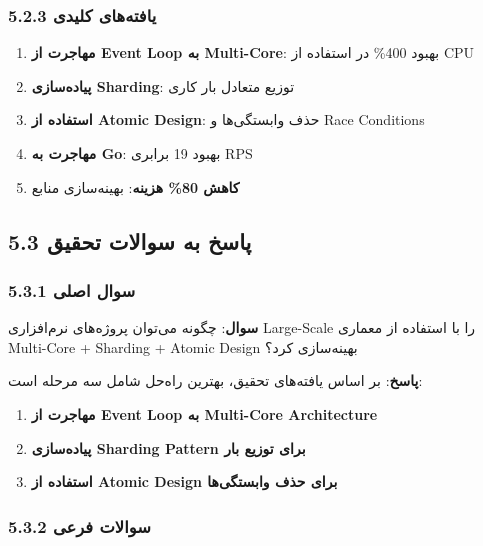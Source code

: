 \documentclass[
]{article}
\providecommand{\tightlist}{%
  \setlength{\itemsep}{0pt}\setlength{\parskip}{0pt}}
\begin{document}
\subsubsection{5.2.3 یافته‌های
کلیدی}\label{ux6ccux627ux641ux62aux647ux647ux627ux6cc-ux6a9ux644ux6ccux62fux6cc-1}

\begin{enumerate}
\def\labelenumi{\arabic{enumi}.}
\tightlist
\item
  \textbf{مهاجرت از Event Loop به Multi-Core}: بهبود 400\% در استفاده از
  CPU
\item
  \textbf{پیاده‌سازی Sharding}: توزیع متعادل بار کاری
\item
  \textbf{استفاده از Atomic Design}: حذف وابستگی‌ها و Race Conditions
\item
  \textbf{مهاجرت به Go}: بهبود 19 برابری RPS
\item
  \textbf{کاهش 80\% هزینه}: بهینه‌سازی منابع
\end{enumerate}

\subsection{5.3 پاسخ به سوالات
تحقیق}\label{ux67eux627ux633ux62e-ux628ux647-ux633ux648ux627ux644ux627ux62a-ux62aux62dux642ux6ccux642-1}

\subsubsection{5.3.1 سوال
اصلی}\label{ux633ux648ux627ux644-ux627ux635ux644ux6cc-1}

\textbf{سوال}: چگونه می‌توان پروژه‌های نرم‌افزاری Large-Scale را با استفاده
از معماری Multi-Core + Sharding + Atomic Design بهینه‌سازی کرد؟

\textbf{پاسخ}: بر اساس یافته‌های تحقیق، بهترین راه‌حل شامل سه مرحله است:

\begin{enumerate}
\def\labelenumi{\arabic{enumi}.}
\tightlist
\item
  \textbf{مهاجرت از Event Loop به Multi-Core Architecture}
\item
  \textbf{پیاده‌سازی Sharding Pattern برای توزیع بار}
\item
  \textbf{استفاده از Atomic Design برای حذف وابستگی‌ها}
\end{enumerate}

\subsubsection{5.3.2 سوالات
فرعی}\label{ux633ux648ux627ux644ux627ux62a-ux641ux631ux639ux6cc-1}
\end{document}
